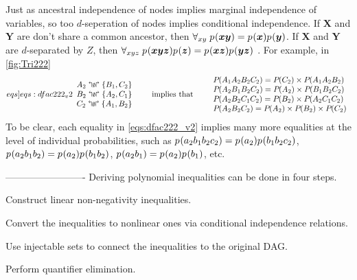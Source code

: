 \begin{asparadesc}
\medskip\item[\tred{NONLINEARITY FROM CONDITIONAL INDEPENDENCE}] \noindent
\par\hspace{\parskip}  Just as ancestral independence of nodes implies marginal independence of variables, so too $d$-seperation of nodes implies conditional independence. If $\bm{X}$ and $\bm{Y}$ are don't share a common ancestor, then ${\forall_{x y}\;{p_{}}\lparen\bm{x} \bm{y} \rparen={p_{}}\lparen\bm{x}\rparen{p_{}}\lparen\bm{y}\rparen}$. If $\bm{X}$ and $\bm{Y}$ are $d$-separated by $Z$, then ${\forall_{xy z}\;{p_{}}\lparen\bm{x} \bm{y} \bm{z}\rparen{p_{}}\lparen\bm{z}\rparen={p_{}}\lparen\bm{x}\bm{z}\rparen{p_{}}\lparen\bm{y}\bm{z}\rparen}$ \cite{pearl2009causality,spirtes2011causation,studeny2005probabilistic,koller2009probabilistic}. For example, in \cref{fig:Tri222}
\begin{align}\begin{split}\label[eqs]{eqs:dfac222_v2}
\larray{
A_2\aindep\{B_1,C_2\}\\
B_2\aindep\{A_2,C_1\}\\
C_2\aindep\{A_1,B_2\}
}\qquad\text{implies that}\qquad
\larray{
\pdf{A_1 A_2 B_2 C_2}=\pdf{C_2}\times\pdf{A_1 A_2 B_2}\\
\pdf{A_2 B_1 B_2 C_2}=\pdf{A_2}\times\pdf{B_1 B_2 C_2}\\
\pdf{A_2 B_2 C_1 C_2}=\pdf{B_2}\times\pdf{A_2 C_1 C_2}\\
\pdf{A_2 B_2 C_2}=\pdf{A_2}\times\pdf{B_2}\times\pdf{C_2}\\
}
\end{split}\end{align}
To be clear, each equality in \cref{eqs:dfac222_v2} implies many more equalities at the level of individual probabilities, such as ${{p_{}}\lparen a_2 b_1 b_2 c_2\rparen= {p_{}}\lparen a_2\rparen {p_{}}\lparen b_1 b_2 c_2\rparen}$, ${{p_{}}\lparen a_2 b_1 b_2\rparen= {p_{}}\lparen a_2\rparen {p_{}}\lparen b_1 b_2\rparen}$, ${{p_{}}\lparen a_2 b_1\rparen= {p_{}}\lparen a_2\rparen {p_{}}\lparen b_1\rparen}$, etc. 



\end{asparadesc}


-------------------------
Deriving polynomial inequalities can be done in four steps. 
\begin{compactenum}
\item Construct linear non-negativity inequalities.
\item Convert the inequalities to nonlinear ones via conditional independence relations.
\item Use injectable sets to connect the inequalities to the original DAG.
\item Perform quantifier elimination.
\end{compactenum}

